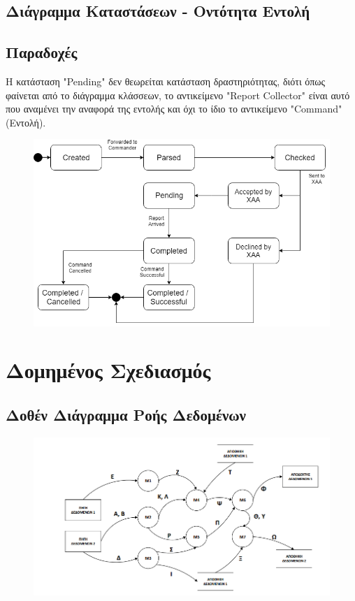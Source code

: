 \documentclass{article}
\begin{document}
\newpage
\subsection{Διάγραμμα Καταστάσεων - Οντότητα Εντολή}
\subsection*{Παραδοχές}
Η κατάσταση "Pending" δεν θεωρείται κατάσταση δραστηριότητας, διότι όπως φαίνεται από το διάγραμμα κλάσσεων, το αντικείμενο
"Report Collector" είναι αυτό που αναμένει την αναφορά της εντολής και όχι το ίδιο το αντικείμενο "Command" (Εντολή).

\begin{figure}[!h]
	\includegraphics[width=\linewidth]{../UML/state_diagram.png}
\end{figure}

\newpage
\section{Δομημένος Σχεδιασμός}
\subsection*{Δοθέν Διάγραμμα Ροής Δεδομένων}
\begin{figure}[!h]
	\includegraphics[width=\linewidth]{../Structured_Design/drd.png}
\end{figure}
\end{document}
